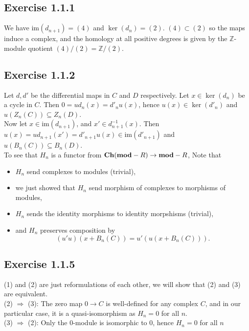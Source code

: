 \documentclass{article}
\theoremstyle{definition}
\newcommand{\Z}{\mathbb{Z}}
\newcommand{\im}{\text{im}}
\newcommand{\catname}[1]{{\normalfont\textbf{#1}}}
\newcommand{\mo}{\catname{mod}}
\newcommand{\Ch}{\catname{Ch}}
\begin{document}
\subsection*{Exercise 1.1.1}

We have $\im(d_{n + 1}) = (4)$ and $\ker(d_n) = (2)$. $(4) \subset (2)$ so the
maps induce a complex, and the homology at all positive degrees is given by the
$\Z$-module quotient $(4)/(2) = \Z/(2)$.

\subsection*{Exercise 1.1.2}

Let $d, d'$ be the differential maps in $C$ and $D$ respectively. Let $x \in
\ker(d_n)$ be a cycle in $C$. Then $0 = ud_n(x) = d'_n u(x)$, hence $u(x) \in
\ker(d'_n)$ and $u(Z_n(C)) \subseteq Z_n(D)$. \\

Now let $x \in \im(d_{n + 1})$, and $x' \in d_{n + 1}^{-1}(x)$. Then $u(x) = u
d_{n+1}(x') = d'_{n + 1}u(x) \in \im(d'_{n+1})$ and $u(B_n(C)) \subseteq
B_n(D)$. \\

To see that $H_n$ is a functor from $\Ch(\mo-R) \to \mo-R$, Note that
\begin{itemize}
	\item $H_n$ send complexes to modules (trivial),
	\item we just showed that $H_n$ send morphism of complexes to morphisms of modules,
	\item $H_n$ sends the identity morphisms to identity morpshisms (trivial),
	\item and $H_n$ preserves composition by
		\[
			(u'u)(x + B_n(C))
			=
			u'(u(x + B_n(C))).
		\] 
\end{itemize}

\subsection*{Exercise 1.1.5}

(1) and (2) are just reformulations of each other, we will show that (2) and
(3) are equivalent. \\

(2) $\Rightarrow$ (3):
The zero map $0 \to C$ is well-defined for any complex $C$, and in our
particular case, it is a quasi-isomorphism as $H_n = 0$ for all $n$. \\

(3) $\Rightarrow$ (2):
Only the $0$-module is isomorphic to $0$, hence $H_n = 0$
for all $n$
\end{document}
